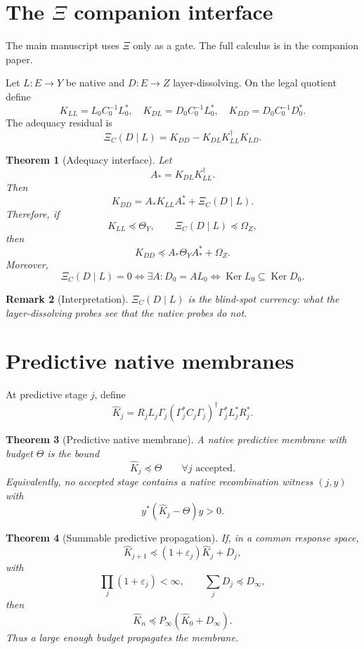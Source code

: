 \documentclass[11pt]{article}
\newtheorem{theorem}{Theorem}[section]
\newtheorem{remark}[theorem]{Remark}
\DeclareMathOperator{\Ker}{Ker}
\newcommand{\XiRes}{\Xi}
\newcommand{\preceqq}{\preceq}
\begin{document}
\section{The \texorpdfstring{\(\Xi\)}{Xi} companion interface}
The main manuscript uses \(\Xi\) only as a gate.  The full calculus is in the companion paper.

Let \(L:E\to Y\) be native and \(D:E\to Z\) layer-dissolving.  On the legal quotient define
\[
  K_{LL}=L_0C_0^{-1}L_0^*,\quad K_{DL}=D_0C_0^{-1}L_0^*,\quad K_{DD}=D_0C_0^{-1}D_0^*.
\]
The adequacy residual is
\[
  \XiRes_C(D\mid L)=K_{DD}-K_{DL}K_{LL}^\dagger K_{LD}.
\]

\begin{theorem}[Adequacy interface]
Let
\[
  A_*=K_{DL}K_{LL}^\dagger.
\]
Then
\[
  K_{DD}=A_*K_{LL}A_*^*+\XiRes_C(D\mid L).
\]
Therefore, if
\[
  K_{LL}\preceqq\Theta_Y,\qquad \XiRes_C(D\mid L)\preceqq\Omega_Z,
\]
then
\[
  K_{DD}\preceqq A_*\Theta_YA_*^*+\Omega_Z.
\]
Moreover,
\[
  \XiRes_C(D\mid L)=0\iff \exists A:D_0=AL_0\iff \Ker L_0\subseteq \Ker D_0.
\]
\end{theorem}

\begin{remark}[Interpretation]
\(\XiRes_C(D\mid L)\) is the blind-spot currency: what the layer-dissolving probes see that the native probes do not.
\end{remark}

\section{Predictive native membranes}
At predictive stage \(j\), define
\[
  \widehat K_j=R_jL_j\Gamma_j(\Gamma_j^*C_j\Gamma_j)^\dagger\Gamma_j^*L_j^*R_j^*.
\]

\begin{theorem}[Predictive native membrane]
A native predictive membrane with budget \(\Theta\) is the bound
\[
  \widehat K_j\preceqq\Theta\qquad\forall j\text{ accepted}.
\]
Equivalently, no accepted stage contains a native recombination witness \((j,y)\) with
\[
  y^*(\widehat K_j-\Theta)y>0.
\]
\end{theorem}

\begin{theorem}[Summable predictive propagation]
If, in a common response space,
\[
  \widehat K_{j+1}\preceqq (1+\varepsilon_j)\widehat K_j+D_j,
\]
with
\[
  \prod_j(1+\varepsilon_j)<\infty,\qquad \sum_jD_j\preceqq D_\infty,
\]
then
\[
  \widehat K_n\preceqq P_\infty(\widehat K_0+D_\infty).
\]
Thus a large enough budget propagates the membrane.
\end{theorem}
\end{document}
